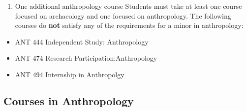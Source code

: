 \documentclass[
  letterpaper,
]{scrbook}
\providecommand{\tightlist}{%
  \setlength{\itemsep}{0pt}\setlength{\parskip}{0pt}}
\begin{document}
\begin{enumerate}
\def\labelenumi{\arabic{enumi}.}
\setcounter{enumi}{5}
\tightlist
\item
  One additional anthropology course Students must take at least one
  course focused on archaeology and one focused on anthropology. The
  following courses do \textbf{not} satisfy any of the requirements for
  a minor in anthropology:
\end{enumerate}

\begin{itemize}
\tightlist
\item
  ANT 444 Independent Study: Anthropology
\item
  ANT 474 Research Participation:Anthropology
\item
  ANT 494 Internship in Anthropolgy
\end{itemize}

\hypertarget{courses-in-anthropology}{%
\subsection{Courses in Anthropology}\label{courses-in-anthropology}}
\end{document}
